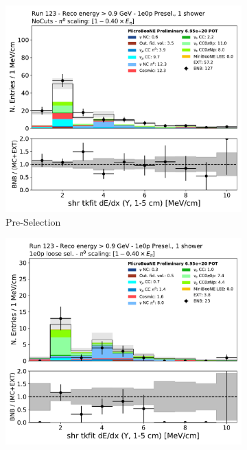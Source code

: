 \begin{figure}[H]
    \centering
    \begin{subfigure}{0.3\textwidth}
    \includegraphics[width=1.0\textwidth]{1e0p/High_E_Sideband/shr_tkfit_gap10_dedx_Y.pdf}
    \caption{Pre-Selection}
    \end{subfigure}
    \begin{subfigure}{0.3\textwidth}
    \includegraphics[width=1.0\textwidth]{1e0p/High_E_Sideband/loose_selection/shr_tkfit_gap10_dedx_Y.pdf}

\end{subfigure}
\end{figure}

